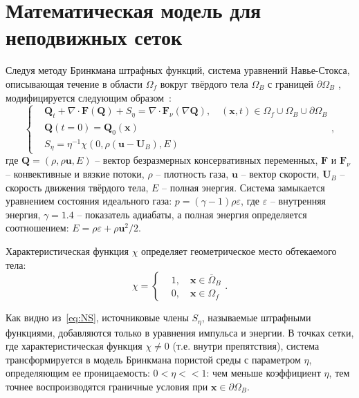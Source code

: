 \section{Математическая модель для неподвижных сеток} \label{app:A1}
Следуя методу Бринкмана штрафных функций, система уравнений Навье-Стокса, описывающая течение в области $\Omega_f$ вокруг твёрдого тела $\Omega_B$ с границей $\partial \Omega_B$ , модифицируется следующим образом~\cite{mittal2005immersed, boiron2009high}:
\begin{equation}
\left\{
\begin{aligned}
&\mathbf{Q}_t + \nabla \cdot \mathbf{F}(\mathbf{Q})+S_{\eta} = \nabla\cdot\mathbf{F}_{\nu}(\nabla \mathbf{Q}), \quad (\mathbf{x}, t) \in \Omega_f \cup \Omega_B \cup \partial\Omega_B\\
&\mathbf{Q}(t=0) = \mathbf{Q}_0(\mathbf{x})\\
&S_{\eta} = \eta^{-1} \chi (0, \rho(\mathbf{u} -\mathbf{U}_B), E)
\end{aligned}
\right. ,
\label{eq:NS}
\end{equation}
где   $\mathbf{Q} = (\rho, \rho\mathbf{u}, E)$ – вектор безразмерных консервативных переменных,  $\mathbf{F}$ и  $\mathbf{F}_{\nu}$ – конвективные и вязкие потоки, $\rho$ – плотность газа,  $\mathbf{u}$ – вектор скорости, $\mathbf{U}_B$   – скорость движения твёрдого тела,  $E$ – полная энергия. Система замыкается уравнением состояния идеального газа: $p = (\gamma - 1)\rho \varepsilon$, где $\varepsilon$  – внутренняя энергия, $\gamma = 1.4$  – показатель адиабаты, а полная энергия определяется соотношением:  $E = \rho \varepsilon + \rho\mathbf{u}^2/2$.

Характеристическая функция $\chi$ определяет геометрическое место обтекаемого тела:
\begin{equation}
\chi = \left\{
\begin{aligned}
&1, \quad \mathbf{x}\in \overline{\Omega}_B\\
&0, \quad \mathbf{x}\in \Omega_f
\end{aligned}
\right. .
\label{eq:chi}
\end{equation}

Как видно из~\eqref{eq:NS}, источниковые члены $S_\eta$, называемые штрафными функциями, добавляются только в уравнения импульса и энергии. В точках сетки, где характеристическая функция  $\chi\ne0$ (т.е. внутри препятствия), система трансформируется в модель Бринкмана пористой среды с параметром $\eta$, определяющим ее проницаемость: $0<\eta<<1$: чем меньше коэффициент $\eta$, тем точнее воспроизводятся граничные условия при  $\mathbf{x}\in\partial\Omega_B$.

